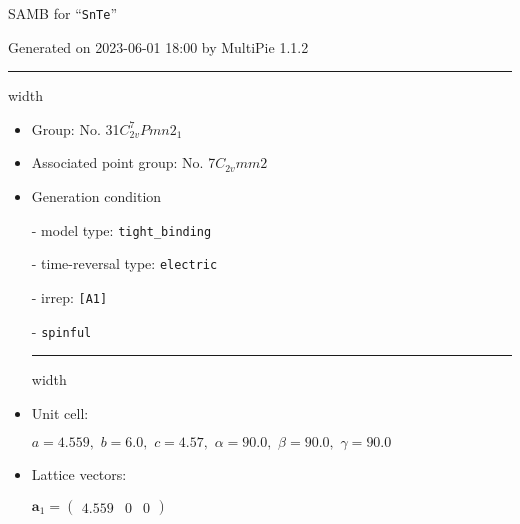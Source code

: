 \documentclass[fleqn,10pt,landscape]{article}
\begin{document}
\setcounter{MaxMatrixCols}{16}

\setlength{\baselineskip}{16pt}
\footnotesize
\begin{center}
\LARGE
SAMB for ``\texttt{SnTe}''
\end{center}
\begin{flushright}
Generated on 2023-06-01 18:00 by MultiPie 1.1.2
\end{flushright}
\vspace{1cm}


 \hfil \hrule height 1mm width \textwidth \hfil

\begin{itemize}
\item Group: No. 31\quad$C_{2v}^{7}$\quad$Pmn2_1$\quad[ orthorhombic ]

\item Associated point group: No. 7\quad$C_{2v}$\quad$mm2$\quad[ orthorhombic ]

\vspace{5mm}

\item Generation condition

\quad - model type: \texttt{tight_binding}

\quad - time-reversal type: \texttt{electric}

\quad - irrep: \texttt{[A1]}

\quad - \texttt{spinful}


 \hfil \hrule height 1mm width \textwidth \hfil

\item Unit cell:

\quad $a=4.559,\,\, b=6.0,\,\, c=4.57,\,\, \alpha=90.0,\,\, \beta=90.0,\,\, \gamma=90.0$

\item Lattice vectors:

\quad $\bm{a}_1=\begin{pmatrix} 4.559 & 0 & 0 \end{pmatrix}$


\end{itemize}
\end{document}
